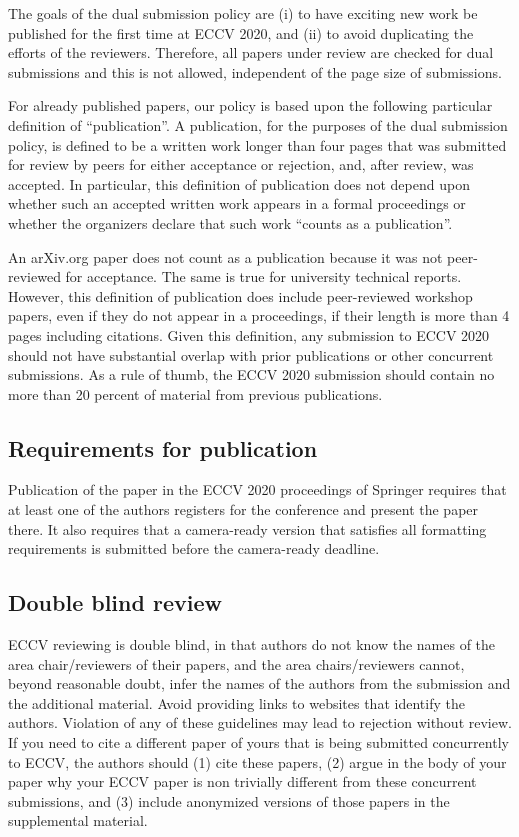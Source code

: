 \documentclass[runningheads]{llncs}
\begin{document}
The goals of the dual submission policy are (i) to have exciting new work be published for the first time at ECCV 2020, and (ii) to avoid duplicating the efforts of the reviewers.
Therefore, all papers under review are checked for dual submissions and this is not allowed, independent of the page size of submissions. 

For already published papers, our policy is based upon the following particular definition of ``publication''. A publication, for the purposes of the dual submission policy, is defined to be a written work longer than four pages that was submitted for review by peers for either acceptance or rejection, and, after review, was accepted. In particular, this definition of publication does not depend upon whether such an accepted written work appears in a formal proceedings or whether the organizers declare that such work ``counts as a publication''. 

An arXiv.org paper does not count as a publication because it was not peer-reviewed for acceptance. The same is true for university technical reports. However, this definition of publication does include peer-reviewed workshop papers, even if they do not appear in a proceedings, if their length is more than 4 pages including citations. Given this definition, any submission to ECCV 2020 should not have substantial overlap with prior publications or other concurrent submissions. As a rule of thumb, the ECCV 2020 submission should contain no more than 20 percent of material from previous publications. 

\subsection{Requirements for publication}
Publication of the paper in the ECCV 2020 proceedings of Springer requires that at least one of the authors registers for the conference and present the paper there. It also requires that a camera-ready version that satisfies all formatting requirements is submitted before the camera-ready deadline. 
\subsection{Double blind review}
\label{sec:blind}
ECCV reviewing is double blind, in that authors do not know the names of the area chair/reviewers of their papers, and the area chairs/reviewers cannot, beyond reasonable doubt, infer the names of the authors from the submission and the additional material. Avoid providing links to websites that identify the authors. Violation of any of these guidelines may lead to rejection without review. If you need to cite a different paper of yours that is being submitted concurrently to ECCV, the authors should (1) cite these papers, (2) argue in the body of your paper why your ECCV paper is non trivially different from these concurrent submissions, and (3) include anonymized versions of those papers in the supplemental material.
\end{document}
